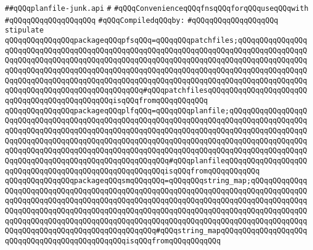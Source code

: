 \label{src/lib/make-library-glue/planfile-junk.api}
\verb|##qQQqplanfile-junk.api|\newline
\verb|#|\newline
\verb|#qQQqConvenienceqQQqfnsqQQqforqQQquseqQQqwith|\newline
\verb|#qQQqqQQqqQQqqQQqqQQq|\newline
\newline
\verb|#qQQqCompiledqQQqby:|\newline
\verb|#qQQqqQQqqQQqqQQqqQQq|\newline
\newline
\newline
\verb|stipulate|\newline
\verb|qQQqqQQqqQQqqQQqpackageqQQqpfsqQQq=qQQqqQQqpatchfiles;qQQqqQQqqQQqqQQqqQQqqQQqqQQqqQQqqQQqqQQqqQQqqQQqqQQqqQQqqQQqqQQqqQQqqQQqqQQqqQQqqQQqqQQqqQQqqQQqqQQqqQQqqQQqqQQqqQQqqQQqqQQqqQQqqQQqqQQqqQQqqQQqqQQqqQQqqQQqqQQqqQQqqQQqqQQqqQQqqQQqqQQqqQQqqQQqqQQqqQQqqQQqqQQqqQQqqQQqqQQqqQQqqQQqqQQqqQQqqQQqqQQqqQQqqQQqqQQqqQQqqQQqqQQqqQQqqQQqqQQqqQQqqQQqqQQqqQQqqQQqqQQqqQQqqQQqqQQqqQQqqQQqqQQq#qQQqpatchfilesqQQqqQQqqQQqqQQqqQQqqQQqqQQqqQQqqQQqqQQqqQQqqQQqisqQQqfromqQQqqQQqqQQq|\newline
\verb|qQQqqQQqqQQqqQQqpackageqQQqplfqQQq=qQQqqQQqplanfile;qQQqqQQqqQQqqQQqqQQqqQQqqQQqqQQqqQQqqQQqqQQqqQQqqQQqqQQqqQQqqQQqqQQqqQQqqQQqqQQqqQQqqQQqqQQqqQQqqQQqqQQqqQQqqQQqqQQqqQQqqQQqqQQqqQQqqQQqqQQqqQQqqQQqqQQqqQQqqQQqqQQqqQQqqQQqqQQqqQQqqQQqqQQqqQQqqQQqqQQqqQQqqQQqqQQqqQQqqQQqqQQqqQQqqQQqqQQqqQQqqQQqqQQqqQQqqQQqqQQqqQQqqQQqqQQqqQQqqQQqqQQqqQQqqQQqqQQqqQQqqQQqqQQqqQQqqQQqqQQqqQQqqQQqqQQqqQQq#qQQqplanfileqQQqqQQqqQQqqQQqqQQqqQQqqQQqqQQqqQQqqQQqqQQqqQQqqQQqqQQqisqQQqfromqQQqqQQqqQQq|\newline
\verb|qQQqqQQqqQQqqQQqpackageqQQqsmqQQqqQQq=qQQqqQQqstring_map;qQQqqQQqqQQqqQQqqQQqqQQqqQQqqQQqqQQqqQQqqQQqqQQqqQQqqQQqqQQqqQQqqQQqqQQqqQQqqQQqqQQqqQQqqQQqqQQqqQQqqQQqqQQqqQQqqQQqqQQqqQQqqQQqqQQqqQQqqQQqqQQqqQQqqQQqqQQqqQQqqQQqqQQqqQQqqQQqqQQqqQQqqQQqqQQqqQQqqQQqqQQqqQQqqQQqqQQqqQQqqQQqqQQqqQQqqQQqqQQqqQQqqQQqqQQqqQQqqQQqqQQqqQQqqQQqqQQqqQQqqQQqqQQqqQQqqQQqqQQqqQQqqQQqqQQqqQQqqQQqqQQqqQQq#qQQqstring_mapqQQqqQQqqQQqqQQqqQQqqQQqqQQqqQQqqQQqqQQqqQQqqQQqisqQQqfromqQQqqQQqqQQq|\newline
